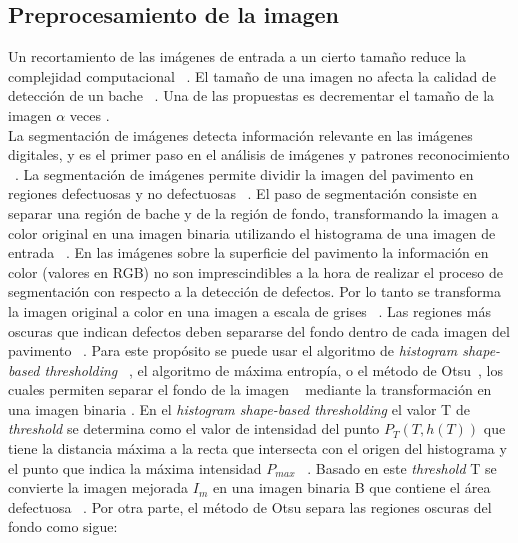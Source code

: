 \subsection{Preprocesamiento de la imagen}
Un recortamiento de las imágenes de entrada a un cierto tamaño reduce la complejidad computacional ~. 
El tamaño de una imagen no afecta la calidad de detección de un bache ~. Una de las propuestas 
es decrementar el tamaño de la imagen $\alpha$ veces . \\
La segmentación de imágenes detecta información relevante en las imágenes digitales, y es el primer paso en el análisis de imágenes y patrones
reconocimiento ~.
La segmentación de imágenes permite  dividir la imagen del pavimento en regiones defectuosas y no defectuosas ~.
El paso de segmentación consiste en separar una región de bache y de la región de fondo, transformando la imagen a color original 
en una imagen binaria utilizando el histograma de una imagen de entrada ~.
En las imágenes sobre la superficie del pavimento la información en color (valores en RGB) no son imprescindibles a la hora de realizar 
el proceso de segmentación con respecto a la detección de defectos. Por lo tanto se  transforma la imagen original a color en una 
imagen a escala de grises  ~. Las regiones más oscuras que indican defectos deben separarse del fondo 
dentro de cada imagen del pavimento ~. Para este propósito se puede usar el algoritmo de 
\emph{histogram shape-based thresholding} ~, el algoritmo de máxima entropía, o el método de Otsu~, 
los cuales permiten separar el fondo de la imagen ~ mediante la transformación en una imagen binaria . 
En el \emph{histogram shape-based thresholding} el valor T de \emph{threshold} se determina como el valor de intensidad del punto $P_T(T, h(T))$ que tiene la distancia máxima a la recta 
que intersecta con el origen del histograma y el punto que indica la máxima intensidad $P_{max}$ ~. 
Basado en este \emph{threshold} T se convierte la imagen mejorada $I_{m}$ en una imagen binaria B que contiene el área defectuosa ~.
Por otra parte, el método de Otsu separa las regiones oscuras del fondo como sigue:

